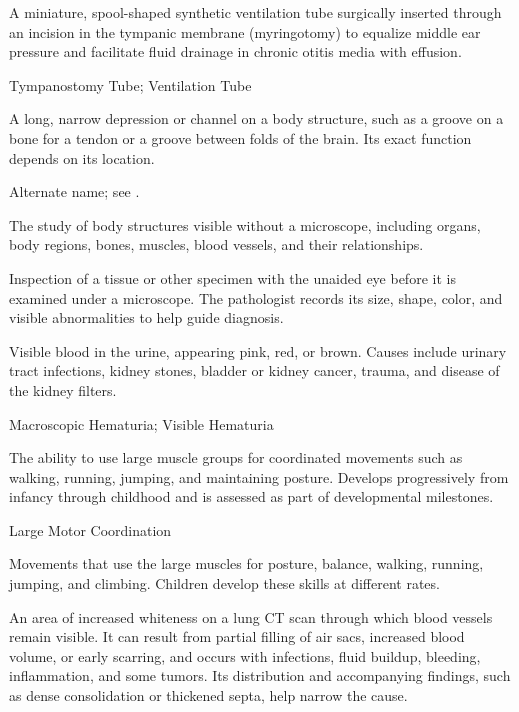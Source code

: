  A miniature, spool-shaped synthetic ventilation tube surgically inserted through an incision in the tympanic membrane (myringotomy) to equalize middle ear pressure and facilitate fluid drainage in chronic otitis media with effusion.

\synonyms
Tympanostomy Tube; Ventilation Tube

 A long, narrow depression or channel on a body structure, such as a groove on a bone for a tendon or a groove between folds of the brain. Its exact function depends on its location.

 Alternate name; see .

 The study of body structures visible without a microscope, including organs, body regions, bones, muscles, blood vessels, and their relationships.

 Inspection of a tissue or other specimen with the unaided eye before it is examined under a microscope. The pathologist records its size, shape, color, and visible abnormalities to help guide diagnosis.

 Visible blood in the urine, appearing pink, red, or brown. Causes include urinary tract infections, kidney stones, bladder or kidney cancer, trauma, and disease of the kidney filters.

\synonyms
Macroscopic Hematuria; Visible Hematuria

 The ability to use large muscle groups for coordinated movements such as walking, running, jumping, and maintaining posture. Develops progressively from infancy through childhood and is assessed as part of developmental milestones.

\synonyms
Large Motor Coordination

 Movements that use the large muscles for posture, balance, walking, running, jumping, and climbing. Children develop these skills at different rates.

 An area of increased whiteness on a lung CT scan through which blood vessels remain visible. It can result from partial filling of air sacs, increased blood volume, or early scarring, and occurs with infections, fluid buildup, bleeding, inflammation, and some tumors. Its distribution and accompanying findings, such as dense consolidation or thickened septa, help narrow the cause.

